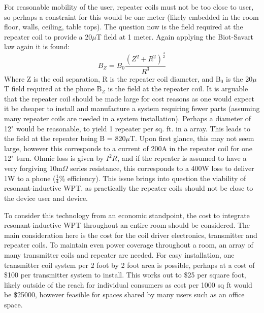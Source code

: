 \documentclass[11pt,letterpaper]{article}
\begin{document}
\noindent For reasonable mobility of the user, repeater coils must not be too close to user, so perhaps a constraint for this would be one meter (likely embedded in the room floor, walls, ceiling, table tops). The question now is the field required at the repeater coil to provide a 20$\mu$T field at 1 meter. Again applying the Biot-Savart law again it is found: 
\begin{equation}
	B_Z = B_0 \frac{(Z^2 + R^2)^\frac{3}{2}}{R^3}
\end{equation}
Where Z is the coil separation, R is the repeater coil diameter, and B$_0$ is the 20$\mu$T field required at the phone B$_Z$ is the field at the repeater coil. It is arguable that the repeater coil should be made large for cost reasons as one would expect it be cheaper to install and manufacture a system requiring fewer parts (assuming many repeater coils are needed in a system installation). Perhaps a diameter of 12" would be reasonable, to yield 1 repeater per sq. ft. in a array. This leads to the field at the repeater being B = 820$\mu$T. Upon first glance, this may not seem large, however this corresponds to a current of 200A in the repeater coil for one 12" turn. Ohmic loss is given by $I^2R$, and if the repeater is assumed to have a very forgiving 10m$\Omega$ series resistance, this corresponds to a 400W loss to deliver 1W to a phone ($\frac{1}{4}$\% efficiency). This issue brings into question the viability of resonant-inductive WPT, as practically the repeater coils should not be close to the device user and device.\\\par 

\noindent To consider this technology from an economic standpoint, the cost to integrate resonant-inductive WPT throughout an entire room should be considered. The main consideration here is the cost for the coil driver electronics, transmitter and repeater coils. To maintain even power coverage throughout a room, an array of many transmitter coils and repeater are needed. For easy installation, one transmitter coil system per 2 foot by 2 foot area is possible, perhaps at a cost of \$100 per transmitter system to install. This works out to \$25 per square foot, likely outside of the reach for individual consumers as cost per 1000 sq ft would be \$25000, however feasible for spaces shared by many users such as an office space. \\\par 
\end{document}
